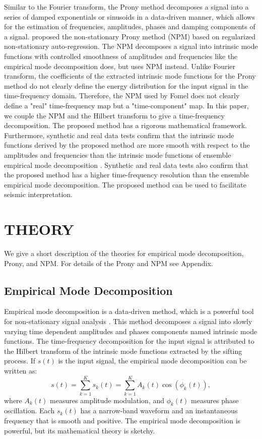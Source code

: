 Similar to the Fourier transform, the Prony method \cite[]{prony} decomposes 
a signal into a series of damped exponentials or sinusoids in a data-driven manner, 
which allows for the estimation of frequencies, amplitudes, phases and damping 
components of a signal. \citet[]{fomel2013} proposed the non-stationary Prony method (NPM)
based on regularized non-stationary auto-regression. The NPM decomposes a signal into 
intrinsic mode functions with controlled smoothness of amplitudes and frequencies 
like the empirical mode decomposition does, but uses NPM instead.
Unlike Fourier transform, the coefficients of the extracted intrinsic mode functions 
for the Prony method do not clearly define the energy distribution for the input 
signal in the time-frequency domain. Therefore, the NPM used by Fomel does not clearly
define a "real" time-frequency map but a "time-component" map. In this paper, we couple the NPM 
\cite[]{fomel2013} and the Hilbert transform to give a time-frequency decomposition. 
The proposed method has a rigorous mathematical framework. Furthermore, 
synthetic and real data tests confirm that the intrinsic mode functions derived by the proposed 
method are more smooth with respect to the amplitudes and frequencies
than the intrinsic mode functions of ensemble empirical mode decomposition \cite[]{eemd}. 
Synthetic and real data tests also confirm that the proposed method
has a higher time-frequency resolution than the ensemble empirical mode decomposition.
The proposed method can be used to facilitate seismic interpretation.

\section{THEORY}
We give a short description of the theories for empirical mode decomposition, Prony, and 
NPM. For details of the Prony and NPM see Appendix.
\subsection{Empirical Mode Decomposition}
Empirical mode decomposition is a data-driven method, which is a powerful 
tool for non-stationary signal analysis \cite[]{emd}. This method decomposes 
a signal into slowly varying time dependent amplitudes and phases components named intrinsic 
mode functions. The time-frequency decomposition for the input signal is attributed to 
the Hilbert transform of the intrinsic mode functions extracted by the sifting process\cite[]{han}. 
If $s(t)$ is the input signal, the empirical mode decomposition can be written as:
\begin{equation}
    \label{eq:eq1}
    s(t) =\sum_{k=1}^{K} s_k (t)= \sum_{k=1}^{K} A_k (t)\cos (\phi_k(t)),
\end{equation}
where $A_k(t)$ measures amplitude modulation, and $\phi_k(t)$ measures 
phase oscillation. Each $s_k(t)$ has a narrow-band 
waveform and an instantaneous frequency that is smooth and positive. 
The empirical mode decomposition is powerful, but its mathematical theory is sketchy.

